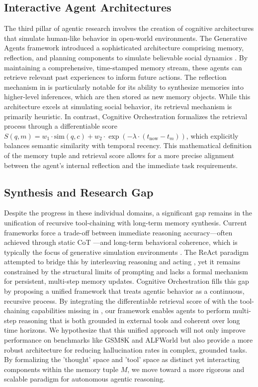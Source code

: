 \documentclass[11pt,a4paper]{article}
\begin{document}
\subsection{Interactive Agent Architectures}

The third pillar of agentic research involves the creation of cognitive architectures that simulate human-like behavior in open-world environments. The Generative Agents framework introduced a sophisticated architecture comprising memory, reflection, and planning components to simulate believable social dynamics \cite{park2023}. By maintaining a comprehensive, time-stamped memory stream, these agents can retrieve relevant past experiences to inform future actions. The reflection mechanism in \cite{park2023} is particularly notable for its ability to synthesize memories into higher-level inferences, which are then stored as new memory objects. While this architecture excels at simulating social behavior, its retrieval mechanism is primarily heuristic. In contrast, Cognitive Orchestration formalizes the retrieval process through a differentiable score $S(q, m) = w_1 \cdot \text{sim}(q, c) + w_2 \cdot \exp(-\lambda \cdot (t_{\text{now}} - t_m))$, which explicitly balances semantic similarity with temporal recency. This mathematical definition of the memory tuple and retrieval score allows for a more precise alignment between the agent's internal reflection and the immediate task requirements.

\subsection{Synthesis and Research Gap}

Despite the progress in these individual domains, a significant gap remains in the unification of recursive tool-chaining with long-term memory synthesis. Current frameworks force a trade-off between immediate reasoning accuracy---often achieved through static CoT \cite{wei2022}---and long-term behavioral coherence, which is typically the focus of generative simulation environments \cite{park2023}. The ReAct paradigm attempted to bridge this by interleaving reasoning and acting \cite{yao2023}, yet it remains constrained by the structural limits of prompting and lacks a formal mechanism for persistent, multi-step memory updates. Cognitive Orchestration fills this gap by proposing a unified framework that treats agentic behavior as a continuous, recursive process. By integrating the differentiable retrieval score of \cite{park2023} with the tool-chaining capabilities missing in \cite{schick2023}, our framework enables agents to perform multi-step reasoning that is both grounded in external tools and coherent over long time horizons. We hypothesize that this unified approach will not only improve performance on benchmarks like GSM8K and ALFWorld but also provide a more robust architecture for reducing hallucination rates in complex, grounded tasks. By formalizing the 'thought' space and 'tool' space as distinct yet interacting components within the memory tuple $M$, we move toward a more rigorous and scalable paradigm for autonomous agentic reasoning.
\end{document}
